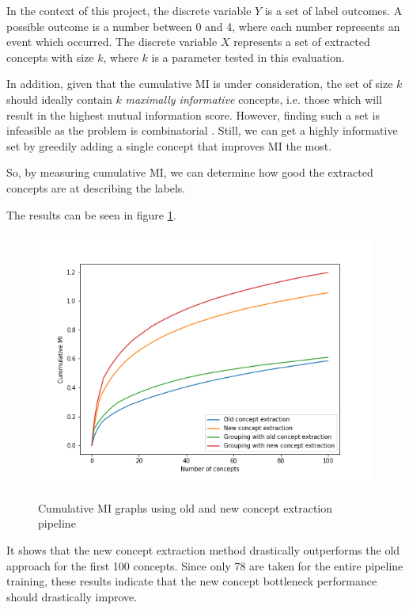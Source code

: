 In the context of this project, the discrete variable $Y$ is a set of label outcomes. A possible outcome is a number between 0 and 4, where each number represents an event which occurred.
The discrete variable $X$ represents a set of extracted concepts with size $k$, where $k$ is a parameter tested in this evaluation.

In addition, given that the cumulative MI is under consideration, the set of size $k$ should ideally contain $k$ \emph{maximally informative} concepts, i.e. those which will result in the highest mutual information score.
However, finding such a set is infeasible as the problem is combinatorial \cite{RefWorks:RefID:16-2021automatic}. Still, we can get a highly informative set by greedily adding a single concept that improves MI the most. 

So, by measuring cumulative MI, we can determine how good the extracted concepts are at describing the labels.

The results can be seen in figure \ref{cummulative-mi-graphs}.


\begin{figure}[h]
\caption{Cumulative MI graphs using old and new concept extraction pipeline}
\centering
\includegraphics[width=\textwidth]{concept-bottleneck-pipeline/Cummulative MI graphs.png}
\label{cummulative-mi-graphs}
\end{figure}


It shows that the new concept extraction method drastically outperforms the old approach for the first 100 concepts.
Since only 78 are taken for the entire pipeline training, these results indicate that the new concept bottleneck performance should drastically improve.


